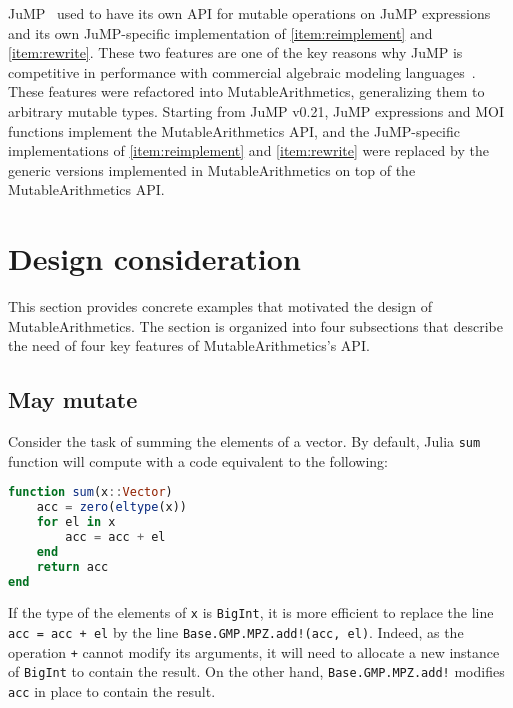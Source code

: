 \documentclass{juliacon}
\newcommand{\ma}{MutableArithmetics}
\begin{document}
JuMP~\cite{dunning2017jump} used to have its own API for mutable operations on JuMP expressions and
its own JuMP-specific implementation of \ref{item:reimplement} and \ref{item:rewrite}.
These two features are one of the key reasons why JuMP is competitive in performance with commercial algebraic modeling languages~\cite[Section~3--4]{dunning2017jump}.
These features were refactored into \ma{}, generalizing them to arbitrary mutable types.
Starting from JuMP v0.21, JuMP expressions and MOI functions implement the \ma{} API, and
the JuMP-specific implementations of \ref{item:reimplement} and \ref{item:rewrite} were replaced by the generic versions implemented in \ma{} on top of the \ma{} API.

\section{Design consideration}
This section provides concrete examples that motivated the design of \ma{}.
The section is organized into four subsections that describe the need of four key features of \ma{}'s API.

\subsection{May mutate}
\label{sec:may_mutate}
Consider the task of summing the elements of a vector.
By default, Julia \texttt{sum} function will compute with a code equivalent to the following:
\begin{lstlisting}[language = Julia]
function sum(x::Vector)
    acc = zero(eltype(x))
    for el in x
        acc = acc + el
    end
    return acc
end
\end{lstlisting}
If the type of the elements of \texttt{x} is \texttt{BigInt}, it is more efficient to replace the line
\lstinline|acc = acc + el| by the line
\lstinline|Base.GMP.MPZ.add!(acc, el)|.
Indeed, as the operation \lstinline|+| cannot modify its arguments,
it will need to allocate a new instance of \texttt{BigInt} to contain the result.
On the other hand, \lstinline|Base.GMP.MPZ.add!| modifies \lstinline|acc| in place to contain the result.
\end{document}
